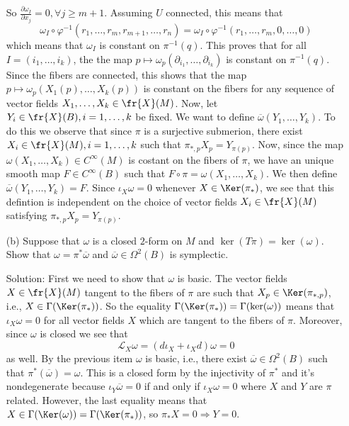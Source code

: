 \begin{example}
\begin{enumerate}
\begin{equation}
    \end{equation}
    So $\tfrac{\partial \omega_I}{\partial x_j}=0,\forall j\geq m+1$. Assuming $U$ connected, this means that 
    \begin{equation}
        \omega_I\circ\varphi^{-1}(r_1,\dots,r_m,r_{m+1},\dots, r_n)=\omega_I\circ\varphi^{-1}(r_1,\dots,r_m,0,\dots,0)
    \end{equation}
    which means that $\omega_I$ is constant on $\pi^{-1}(q)$. This proves that for all $I=(i_1,\dots, i_k)$, 
    the the map $p\mapsto \omega_p(\partial_{i_1},\dots,\partial_{i_k})$ is constant 
    on $\pi^{-1}(q)$. Since the fibers are connected, 
    this shows that the map $p\mapsto \omega_p(X_1(p),\dots, X_k(p))$ is constant on the fibers 
    for any sequence of vector fields $X_1,\dots, X_k\in\fr{X}(M)$. Now, let $Y_i\in\fr{X}(B),i=1,\dots,k$ be fixed. We want 
    to define $\overline{\omega}(Y_1,\dots,Y_k)$. To do this we observe that since $\pi$ is a surjective submerion, there exist 
    $X_i\in\fr{X}(M),i=1,\dots,k$ such that $\pi_{*,p}X_p=Y_{\pi(p)}$. Now, since the 
    map $\omega(X_1,\dots, X_k)\in C^\infty(M)$ is costant on the fibers of $\pi$, we have an unique smooth map 
    $F\in C^\infty(B)$ such that $F\circ\pi = \omega(X_1,\dots, X_k)$. We then define $\overline{\omega}(Y_1,\dots,Y_k)=F$. Since 
    $\iota_X\omega=0$ whenever $X\in\Ker(\pi_{*})$, we see that this defintion is independent on the choice of vector fields 
    $X_i\in\fr{X}(M)$ satisfying $\pi_{*,p}X_p=Y_{\pi(p)}$.


    \item[(b)] Suppose that $\omega$ is a closed $2$-form on $M$ and $\ker(T\pi) = \ker(\omega)$. 
    Show that $\omega = \pi^*\overline{\omega}$ and $\overline{\omega} \in \Omega^2(B)$ is symplectic.\par 
    Solution: First we need to show that $\omega$ is basic. The vector fields $X\in\fr{X}(M)$ 
    tangent to the fibers of $\pi$ are such that $X_p\in\Ker(\pi_{*,p})$, i.e., $X\in\Gamma(\Ker(\pi_*))$. So the 
    equality $\Gamma(\Ker(\pi_*))=\Gamma(\ker(\omega))$ means that $\iota_X\omega=0$ for all vector fields $X$ which are 
    tangent to the fibers of $\pi$. Moreover, since $\omega$ is closed we see that 
    \begin{equation}
        \mathcal{L}_X\omega = (d\iota_X+\iota_Xd)\omega=0
    \end{equation} 
    as well. By the previous item $\omega$ is basic, i.e., there exist $\overline{\omega}\in\Omega^2(B)$ such that 
    $\pi^*(\overline{\omega})=\omega$. This is a closed form by the injectivity of $\pi^*$ and it's nondegenerate because 
    $\iota_Y\overline{\omega}=0$ if and only if $\iota_X\omega=0$ where $X$ and $Y$ are $\pi$ related. However, the last 
    equality means that $X\in\Gamma(\Ker(\omega))=\Gamma(\Ker(\pi_*))$, so $\pi_*X=0\Rightarrow Y=0$.


\end{enumerate}
\end{example}
